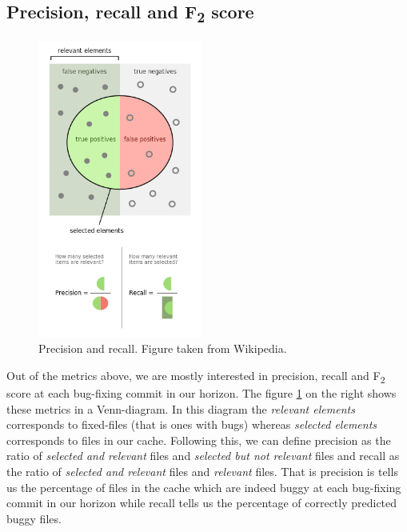 \documentclass[12pt,twoside,notitlepage]{report}
\begin{document}
\subsection{Precision, recall and F\textsubscript{2} score}
\begin{figure}
\includegraphics[width=0.48\textwidth]{Precisionrecall.png}
 \begin{minipage}{\linewidth}
    \caption[Precision and recall.]%
    {Precision and recall. Figure taken from Wikipedia\footnotemark.}
  \end{minipage}
  \label{precisionrecall}
\end{figure}
Out of the metrics above, we are mostly interested in precision, recall and F\textsubscript{2} score at each bug-fixing commit in our horizon. The figure \ref{precisionrecall} on the right shows these metrics in a Venn-diagram. In this diagram the \textit{relevant elements} corresponds to fixed-files (that is ones with bugs) whereas \textit{selected elements} corresponds to files in our cache. Following this, we can define precision as the ratio of \textit{selected and relevant} files and \textit{selected but not relevant} files and recall as the ratio of \textit{selected and relevant} files and \textit{relevant} files. That is precision is tells us the percentage of files in the cache which are indeed buggy at each bug-fixing commit in our horizon while recall tells us the percentage of correctly predicted buggy files. 
\end{document}

